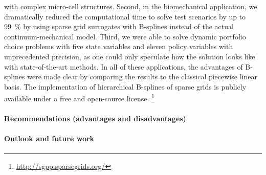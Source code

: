 with complex micro-cell structures.
Second, in the biomechanical application,
we dramatically reduced the computational time to solve
test scenarios by up to \SI{99}{\percent} by using
sparse grid surrogates with B-splines instead of the
actual continuum-mechanical model.
Third, we were able to solve dynamic portfolio choice problems
with five state variables and eleven policy variables
with unprecedented precision, as one could only speculate
how the solution looks like with state-of-the-art methods.
In all of these applications, the advantages of B-splines were made clear
by comparing the results to the classical piecewise linear basis.
The implementation of hierarchical B-splines of sparse grids is
publicly available under a free and open-source license.%
\footnote{%
  \url{http://sgpp.sparsegrids.org/}%
}

\paragraph{Recommendations (advantages and disadvantages)}


\dummytext[1]{}

\paragraph{Outlook and future work}


